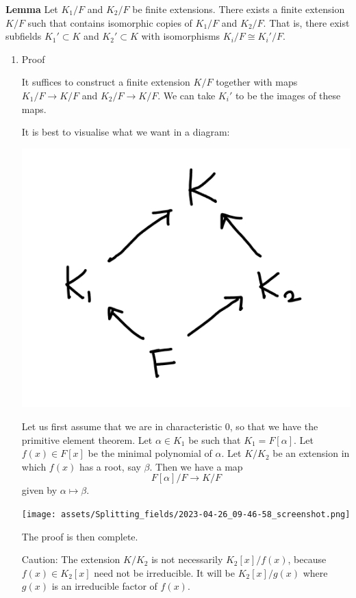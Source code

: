 \documentclass[11pt]{article}
\begin{document}
\textbf{Lemma} Let \(K_1/F\) and \(K_2/F\) be finite extensions.
There exists a finite extension \(K/F\) such that contains isomorphic copies of \(K_1/F\) and \(K_2/F\).
That is, there exist subfields \(K_{1}' \subset K\) and \(K_2' \subset K\) with isomorphisms \(K_{i}/F \cong K_{i}'/F\).
\begin{enumerate}
\item Proof
\label{sec:org7c1be50}

It suffices to construct a finite extension \(K/F\) together with maps \(K_1/F \to K/F\) and \(K_2/F \to K/F\).  We can take \(K_i'\) to be the images of these maps.

It is best to visualise what we want in a diagram:
\begin{center}
\includegraphics[width=.9\linewidth]{assets/Course_notes/2023-04-24_11-50-13_screenshot.png}
\end{center}

Let us first assume that we are in characteristic 0, so that we have the primitive element theorem.
Let \(\alpha \in K_1\) be such that \(K_1 = F[\alpha]\).
Let \(f(x) \in F[x]\) be the minimal polynomial of \(\alpha\).
Let \(K/K_2\) be an extension in which \(f(x)\) has a root, say \(\beta\).
Then we have a map
\[ F[\alpha]/F \to K/F\]
given by \(\alpha \mapsto \beta\).

\begin{center}
\texttt{[image: assets/Splitting\_fields/2023-04-26\_09-46-58\_screenshot.png]}
\end{center}
The proof is then complete.

Caution: The extension \(K/K_2\) is not necessarily \(K_2[x]/f(x)\), because \(f(x) \in K_2[x]\) need not be irreducible.  It will be \(K_2[x]/g(x)\) where \(g(x)\) is an irreducible factor of \(f(x)\).  


\end{enumerate}
\end{document}
